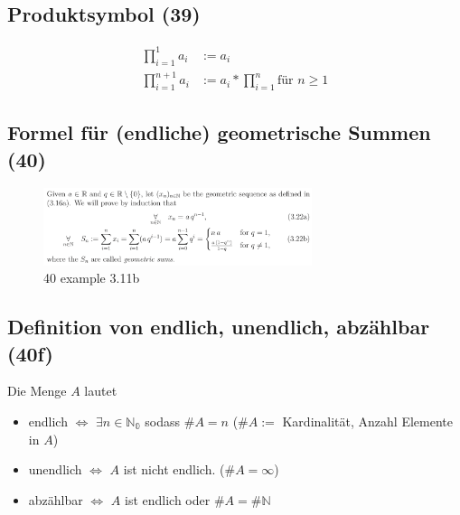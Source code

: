 \subsection{Produktsymbol (39)}
\begin{equation}
\begin{split}
\prod\nolimits_{i=1}^1 a_i &:= a_i \\
\prod\nolimits_{i=1}^{n+1} a_i &:= a_i * \prod\nolimits_{i=1}^{n} \text{für } n \geq 1
\end{split}
\end{equation}


\subsection{Formel für (endliche) geometrische Summen (40)}
\begin{figure}[H]
	\centering
  \includegraphics[width=0.7\textwidth]{media/40-example-3-11b.png}
	\caption{40 example 3.11b}
	\label{40_example_3.11b}
\end{figure}

\subsection{Definition von endlich, unendlich, abzählbar (40f)} 
Die Menge $A$ lautet
\begin{itemize}
\item endlich $\Leftrightarrow$ $\exists n \in \mathbb{N_0}$ sodass $\#A = n$ ($\#A :=$ Kardinalität, Anzahl Elemente in $A$)
\item unendlich $\Leftrightarrow$ $A$ ist nicht endlich. ($\#A = \infty$)
\item abzählbar $\Leftrightarrow$ $A$ ist endlich oder $\#A = \#\mathbb{N}$
\end{itemize}
